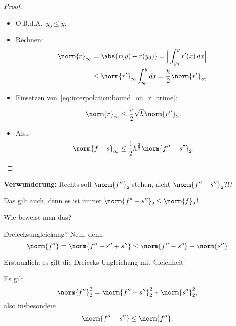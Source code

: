 \begin{proof}
\begin{itemize}
 \item O.B.d.A.\ $y_0\leq y$.

 \item Rechnen:
  \begin{align*}
    \norm{r}_\infty
    & =
    \abs{r(y) - r(y_0)}
    =
    \Big\vert \int_{y_0}^y r'(x)\,dx \Big\vert \\
    & \leq
    \norm{r'}_\infty\int_{y_0}^y dx
    =
    \frac{h}{2}\norm{r'}_\infty.
  \end{align*}

 \item Einsetzen von~\eqref{eq:interpolation:bound_on_r_prime}:
  \begin{equation*}
   \norm{r}_\infty \leq \frac{h}{2}\sqrt{h}\norm{r''}_2.
  \end{equation*}

 \item Also
   \begin{equation*}
    \norm{f-s}_\infty\leq \frac{1}{2}h^{\frac{3}{2}}\norm{f'' - s''}_2.
    \qedhere
   \end{equation*}

\end{itemize}

\end{proof}

\textbf{Verwunderung:} Rechts soll $\norm{f''}_2$ stehen, nicht $\norm{f'' - s''}_2$?!?

\medskip

Das gilt auch, denn es ist immer $\norm{f'' - s''}_2 \leq \norm{f}_2$!

\bigskip

Wie beweist man das?

\medskip

Dreiecksungleichung? Nein, denn
\begin{equation*}
 \norm{f''}
 =
 \norm{f'' - s'' + s''}
 \leq
 \norm{f'' - s''} + \norm{s''}
\end{equation*}

Erstaunlich: es gilt die Dreiecks-Ungleichung mit Gleichheit!
\begin{satz}
\label{thm:interpolation:pythagoras}
 Es gilt
 \begin{equation*}
  \norm{f''}_2^2 = \norm{f'' - s''}_2^2 + \norm{s''}^2_2,
 \end{equation*}
 also insbesondere
 \begin{equation*}
  \norm{f'' - s''} \leq \norm{f''}.
 \end{equation*}
\end{satz}

